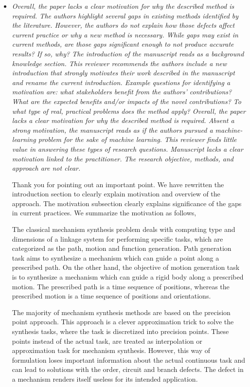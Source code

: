 \documentclass{article}
\begin{document}
\begin{itemize}
  \item \emph{
Overall, the paper lacks a clear motivation for why the described method is required.
The authors highlight several gaps in existing methods identified by the literature.
However, the authors do not explain how those defects affect current practice or why a new method is necessary.
While gaps may exist in current methods, are those gaps significant enough to not produce accurate results? If so, why? The introduction of the manuscript reads as a background knowledge section.
This reviewer recommends the authors include a new introduction that strongly motivates their work described in the manuscript and rename the current introduction.
Example questions for identifying a motivation are: what stakeholders benefit from the authors' contributions? What are the expected benefits and/or impacts of the novel contributions? To what type of real, practical problems does the method apply?
Overall, the paper lacks a clear motivation for why the described method is required.
Absent a strong motivation, the manuscript reads as if the authors pursued a machine-learning problem for the sake of machine learning. This reviewer finds little value in answering these types of research questions.
Manuscript lacks a clear motivation linked to the practitioner.
The research objective, methods, and approach are not clear.
}

Thank you for pointing out an important point.
We have rewritten the introduction section to clearly explain motivation and overview of the approach.
The motivation subsection clearly explains significance of the gaps in current practices.
We summarize the motivation as follows,

The classical mechanism synthesis problem deals with computing type and dimensions of a linkage system for performing specific tasks, which are categorized as the path, motion and function generation.
Path generation task aims to synthesize a mechanism which can guide a point along a prescribed path.
On the other hand, the objective of motion generation task is to synthesize a mechanism which can guide a rigid body along a prescribed motion.
The prescribed path is a time sequence of positions, whereas the prescribed motion is a time sequence of positions and orientations.

The majority of mechanism synthesis methods are based on the precision point approach.
This approach is a clever approximation trick to solve the synthesis tasks, where the task is discretized into precision points.
These points instead of the actual task, are treated as interpolation or approximation task for mechanism synthesis.
However, this way of formulation loses important information about the actual continuous task and can lead to solutions with the order, circuit and branch defects.
The defect in a mechanism renders itself useless for its intended application.


\end{itemize}
\end{document}
